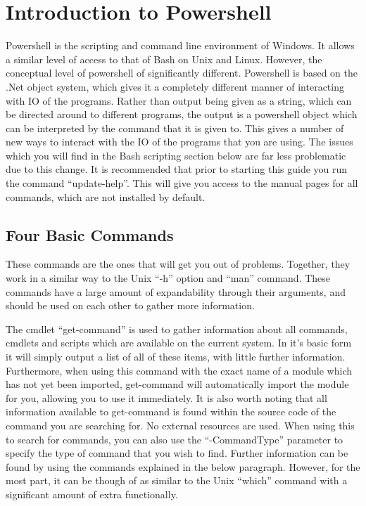 	\section{Introduction to Powershell}
		Powershell is the scripting and command line environment of Windows.\cite{EffectivePS} 
		It allows a similar level of access to that of Bash on Unix and Linux. 
		However, the conceptual level of powershell of significantly different. 
		Powershell is based on the .Net object system, which gives it a completely different manner of interacting with IO of the programs. 
		Rather than output being given as a string, which can be directed around to different programs, the output is a powershell object which can be interpreted by the command that it is given to. 
		This gives a number of new ways to interact with the IO of the programs that you are using. 
		The issues which you will find in the Bash scripting section below are far less problematic due to this change. 
		It is recommended that prior to starting this guide you run the command ``update-help''. 
		This will give you access to the manual pages for all commands, which are not installed by default. 
		\subsection{Four Basic Commands}
			These commands are the ones that will get you out of problems. 
			Together, they work in a similar way to the Unix ``-h'' option and ``man'' command. 
			These commands have a large amount of expandability through their arguments, and should be used on each other to gather more information. 

			The cmdlet ``get-command'' is used to gather information about all commands, cmdlets and scripts which are available on the current system. 
			In it's basic form it will simply output a list of all of these items, with little further information.
			Furthermore, when using this command with the exact name of a module which has not yet been imported, get-command will automatically import the module for you, allowing you to use it immediately. 
			It is also worth noting that all information available to get-command is found within the source code of the command you are searching for. 
			No external resources are used.
			When using this to search for commands, you can also use the ``-CommandType'' parameter to specify the type of command that you wish to find. 
			Further information can be found by using the commands explained in the below paragraph. 
			However, for the most part, it can be though of as similar to the Unix ``which'' command with a significant amount of extra functionally. 

